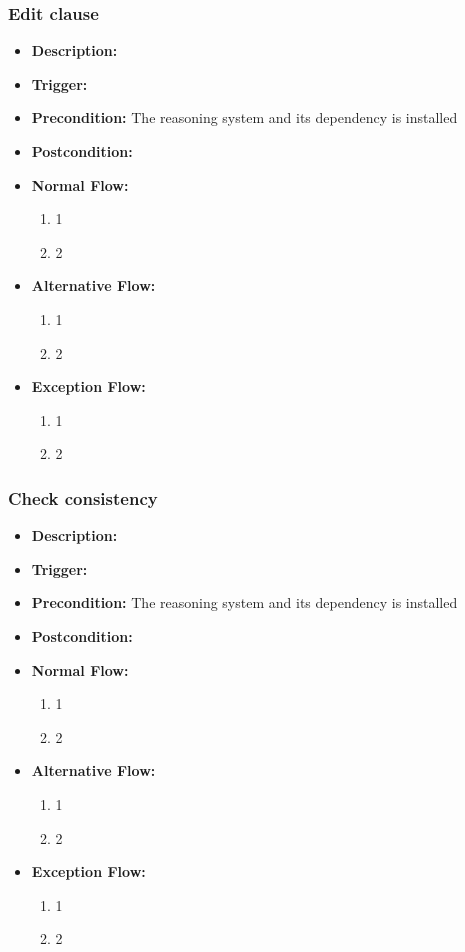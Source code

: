 \documentclass[../gr-final.tex]{subfiles}
\begin{document}
\subsubsection{Edit clause}
\begin{itemize}
  \item {\bfseries Description:} 
  \item {\bfseries Trigger:}
  \item {\bfseries Precondition:} The reasoning system and its
    dependency is installed
    
  \item {\bfseries Postcondition:}

  \item {\bfseries Normal Flow:}
    \begin{enumerate}
      \item 1
      \item 2
    \end{enumerate}
  \item {\bfseries Alternative Flow:}
    \begin{enumerate}
      \item 1
      \item 2
    \end{enumerate}
  \item {\bfseries Exception Flow:}
    \begin{enumerate}
      \item 1
      \item 2
    \end{enumerate}
\end{itemize}
\subsubsection{Check consistency}
\begin{itemize}
  \item {\bfseries Description:} 
  \item {\bfseries Trigger:}
  \item {\bfseries Precondition:} The reasoning system and its
    dependency is installed
    
  \item {\bfseries Postcondition:}

  \item {\bfseries Normal Flow:}
    \begin{enumerate}
      \item 1
      \item 2
    \end{enumerate}
  \item {\bfseries Alternative Flow:}
    \begin{enumerate}
      \item 1
      \item 2
    \end{enumerate}
  \item {\bfseries Exception Flow:}
    \begin{enumerate}
      \item 1
      \item 2
    \end{enumerate}
\end{itemize}
\end{document}
